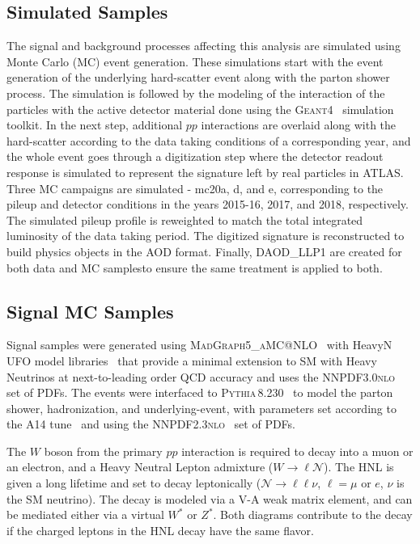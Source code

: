 \subsection{Simulated Samples}
The signal and background processes affecting this analysis are simulated using Monte Carlo (MC) event generation. These simulations start with the event generation of the underlying hard-scatter event along with the parton shower process. The simulation is followed by the modeling of the interaction of the particles with the active detector material done using the \textsc{Geant4}~\cite{AGOSTINELLI2003250} simulation toolkit. In the next step, additional $pp$ interactions are overlaid along with the hard-scatter according to the data taking conditions of a corresponding year, and the whole event goes through a digitization step where the detector readout response is simulated to represent the signature left by real particles in ATLAS. Three MC campaigns are simulated - mc20a, d, and e, corresponding to the pileup and detector conditions in the years 2015-16, 2017, and 2018, respectively. The simulated pileup profile is reweighted to match the total integrated luminosity of the data taking period. The digitized signature is reconstructed to build physics objects in the AOD format. Finally, DAOD\_LLP1 are created for both data and MC samplesto ensure the same treatment is applied to both.

\subsection*{Signal MC Samples}
Signal samples were generated using \textsc{MadGraph5\_aMC@NLO}~\cite{Alwall:2014hca} with HeavyN UFO model libraries~\cite{PhysRevD.94.053002} that provide a minimal extension to SM with Heavy Neutrinos at next-to-leading order QCD accuracy and uses the \textsc{NNPDF3.0nlo}~\cite{Ball:2014uwa} set of PDFs. The events were interfaced to \textsc{Pythia\,8.230}~\cite{Sjostrand:2014zea} to model the parton shower, hadronization, and underlying-event, with parameters set according to the A14 tune~\cite{ATL-PHYS-PUB-2014-021} and using the \textsc{NNPDF2.3nlo}~\cite{Ball:2012cx} set of PDFs.

The $W$ boson from the primary $pp$ interaction is required to decay into a muon or an electron, and a Heavy Neutral Lepton admixture ($W\to\ell\mathcal{N}$). The HNL is given a long lifetime and set to decay leptonically ($\mathcal{N}\to\ell\ell\nu$, $\ell=\mu$ or $e$, $\nu$ is the SM neutrino). The decay is modeled via a V-A weak matrix element, and can be mediated either via a virtual $W^*$ or $Z^*$. Both diagrams contribute to the decay if the charged leptons in the HNL decay have the same flavor.

